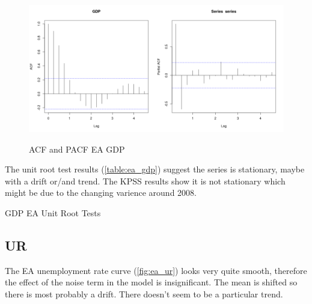 \documentclass[10pt]{article}
\begin{document}
\begin{figure}[h!]
\centering
\includegraphics[width = 0.5\textwidth]{../acf/ea_GDP}\includegraphics[width = 0.5\textwidth]{../pacf/ea_GDP}
\caption{ACF and PACF EA GDP}
\label{fig:ea_gdp_acf}
\end{figure}

The unit root test results (\autoref{table:ea_gdp}) suggest the series is stationary, maybe with a drift or/and trend. The KPSS results show it is not stationary which might be due to the changing varience around 2008.

\begin{table}[h!]
\centering
{}
\caption{GDP EA Unit Root Tests}
\label{table:ea_gdp}
\end{table}



\subsection{UR}

The EA unemployment rate curve (\autoref{fig:ea_ur}) looks very quite smooth, therefore the effect of the noise term in the model is insignificant. The mean is shifted so there is most probably a drift. There doesn't seem to be a particular trend.
\end{document}
